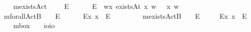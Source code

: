 \begin{isabellebody}
\ \ \isamarkupfalse%
\ mexistsAct\ \ \ {\isacharcolon}{\isacharcolon}\ {\isachardoublequoteopen}{\isasymup}{\isasymlangle}{\isasymup}{\isasymlangle}{\isasymzero}{\isasymrangle}{\isasymrangle}{\isachardoublequoteclose}\ {\isacharparenleft}{\isachardoublequoteopen}\isactrlbold {\isasymexists}\isactrlsup E{\isachardoublequoteclose}{\isacharparenright}\ \isanewline
\ \ \ \ \ {\isachardoublequoteopen}\isactrlbold {\isasymexists}\isactrlsup E{\isasymPhi}\ {\isasymequiv}\ {\isasymlambda}w{\isachardot}{\isasymexists}x{\isachardot}\ {\isacharparenleft}existsAt\ x\ w{\isacharparenright}\ {\isasymand}\ {\isacharparenleft}{\isasymPhi}\ x\ w{\isacharparenright}{\isachardoublequoteclose}\isanewline
\isanewline
\ \ \isamarkupfalse%
\ mforallActB\ \ {\isacharcolon}{\isacharcolon}\ {\isachardoublequoteopen}{\isasymup}{\isasymlangle}{\isasymup}{\isasymlangle}{\isasymzero}{\isasymrangle}{\isasymrangle}{\isachardoublequoteclose}\ {\isacharparenleft}\isactrlbold {\isasymforall}\isactrlsup E{\isachardoublequoteclose}{\isacharbrackleft}{}{\isacharbrackright}{}{\isacharparenright}\ %
\isanewline
\ \ \ \ \ {\isachardoublequoteopen}\isactrlbold {\isasymforall}\isactrlsup Ex{\isachardot}\ {\isasymphi}{\isacharparenleft}x{\isacharparenright}\ {\isasymequiv}\ \isactrlbold {\isasymforall}\isactrlsup E{\isasymphi}{\isachardoublequoteclose}\ \ \ \ \ \isanewline
\ \ \isamarkupfalse%
\ mexistsActB\ \ {\isacharcolon}{\isacharcolon}\ {\isachardoublequoteopen}{\isasymup}{\isasymlangle}{\isasymup}{\isasymlangle}{\isasymzero}{\isasymrangle}{\isasymrangle}{\isachardoublequoteclose}\ {\isacharparenleft}\isactrlbold {\isasymexists}\isactrlsup E{\isachardoublequoteclose}{\isacharbrackleft}{}{\isacharbrackright}{}{\isacharparenright}\isanewline
\ \ \ \ \ {\isachardoublequoteopen}\isactrlbold {\isasymexists}\isactrlsup Ex{\isachardot}\ {\isasymphi}{\isacharparenleft}x{\isacharparenright}\ {\isasymequiv}\ \isactrlbold {\isasymexists}\isactrlsup E{\isasymphi}{\isachardoublequoteclose}%
\isamarkuptrue%
\ \ \isamarkupfalse%
\ mbox\ \ \ {\isacharcolon}{\isacharcolon}\ {\isachardoublequoteopen}io{\isasymRightarrow}io{\isachardoublequoteclose}\ {\isacharparenleft}{\isachardoublequoteopen}\isanewline

\end{isabellebody}
